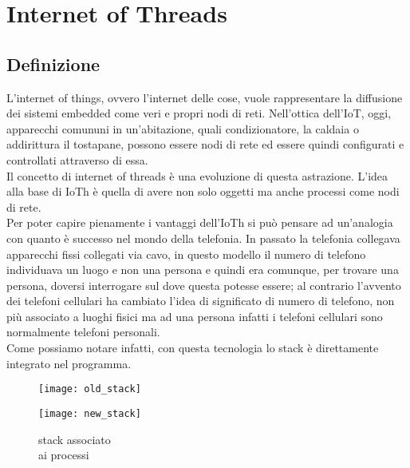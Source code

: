 \chapter{Internet of Threads}                %
\lhead[\fancyplain{}{\bfseries\thepage}]{\fancyplain{}{\bfseries\rightmark}}
\section{Definizione}                 %
L'internet of things, ovvero l'internet delle cose, vuole rappresentare la diffusione dei sistemi embedded come veri e propri nodi di reti. Nell'ottica dell'IoT, oggi, apparecchi comununi in un'abitazione, quali condizionatore, la caldaia o addirittura il tostapane, possono essere nodi di rete ed essere quindi configurati e controllati attraverso di essa.\\
Il concetto di internet of threads \`e una evoluzione di questa astrazione. L'idea alla base di IoTh \`e quella di avere non solo oggetti ma anche processi come nodi di rete.\\
Per poter capire pienamente i vantaggi dell'IoTh si pu\`o pensare ad un'analogia con quanto \`e successo nel mondo della telefonia. In passato la telefonia collegava apparecchi fissi collegati via cavo, in questo modello il numero di telefono individuava un luogo e non una persona e quindi era comunque, per trovare una persona, doversi interrogare sul dove questa potesse essere; al contrario l'avvento dei telefoni cellulari ha cambiato l'idea di significato di numero di telefono, non pi\`u associato a luoghi fisici ma ad una persona infatti i telefoni cellulari sono normalmente telefoni personali\cite{K1,K2}.\\
Come possiamo notare infatti, con questa tecnologia lo stack \`e direttamente integrato nel programma.
\begin{figure}[h]
\centering
\begin{minipage}{.5\textwidth}
\centering
\texttt{[image: old\_stack]}
\caption[physical interface stack]{stack associato\\ all'interfaccia fisica}\label{fig:fisical}
\end{minipage}%
\begin{minipage}{.5\textwidth}
\centering
\texttt{[image: new\_stack]}
\caption[virtual stack]{stack associato\\ ai processi}\label{fig:virtual}
\end{minipage}
\end{figure}\\
